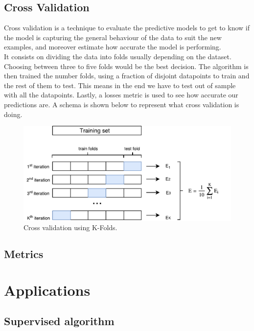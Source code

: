 \documentclass[a4paper,11pt,spanish]{report}
\begin{document}
\section{Cross Validation}
\label{sec:cv}

Cross validation is a technique to evaluate the predictive models to get to know if the model is capturing the general behaviour of the data to suit the new examples, and moreover estimate how accurate the model is performing.\\
It consists on dividing the data into folds usually depending on the dataset. Choosing between three to five folds would be the best decision. The algorithm is then trained the number folds, using a fraction of disjoint datapoints to train and the rest of them to test. This means in the end we have to test out of sample with all the datapoints. Lastly, a losses metric is used to see how accurate our predictions are. A schema is shown below to represent what cross validation is doing.
\begin{figure}[h]
\centering
\includegraphics[width=12cm]{figures/cv.pdf}
\caption{\label{figurefit}Cross validation using K-Folds.}
\end{figure}

\section{Metrics}
\label{sec:met}



\chapter{Applications}
\label{chap:app}

\section{Supervised algorithm}
\label{sec:sup}
\end{document}
